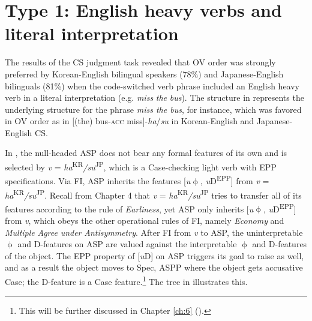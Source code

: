 \section{Type 1: English heavy verbs and literal interpretation}\label{ch5:sect:5.1}

The results of the \ac{CS} judgment task revealed that \ac{OV} order was strongly preferred by Korean-English bilingual speakers (78\%) and Japanese-English bilinguals (81\%) when the code-switched verb phrase included an English heavy verb in a literal interpretation (e.g. \textit{miss} \textit{the} \textit{bus}). The structure in  represents the underlying structure for the phrase \textit{miss the bus}, for instance, which was favored in \ac{OV} order as in [(the) bus-\textsc{acc} miss]-\textit{ha}/\textit{su} in Korean-English and Japanese-English \ac{CS}.

\ea\label{ex:112}
\z

In , the null-headed \ac{ASP} does not bear any formal features of its own and is selected by \textit{v} = \textit{ha}\textsuperscript{KR}\textit{/su}\textsuperscript{JP}, which is a Case-checking light verb with \ac{EPP} specifications. Via \ac{FI}, \ac{ASP} inherits the features [\textit{u}$\upphi$, \textit{u}D\textsuperscript{EPP}] from \textit{v} = \textit{ha}\textsuperscript{KR}\textit{/su}\textsuperscript{JP}. Recall from Chapter 4 that \textit{v} = \textit{ha}\textsuperscript{KR}\textit{/su}\textsuperscript{JP} tries to transfer all of its features according to the rule of \textit{Earliness}, yet \ac{ASP} only inherits [\textit{u}$\upphi$, \textit{u}D\textsuperscript{EPP}] from \textit{v}, which obeys the other operational rules of \ac{FI}, namely \textit{Economy} and \textit{Multiple} \textit{Agree} \textit{under} \textit{Antisymmetry}. After \ac{FI} from \textit{v} to \ac{ASP}, the uninterpretable $\upphi$ and D-features on \ac{ASP} are valued against the interpretable $\upphi$ and D-features of the object. The \ac{EPP} property of [\textit{u}D] on \ac{ASP} triggers its goal to raise as well, and as a result the object moves to Spec, \ac{ASP}P where the object gets accusative Case; the D-feature is a Case feature.\footnote{This will be further discussed in Chapter \ref{ch:6}  ().} The tree in  illustrates this. 

